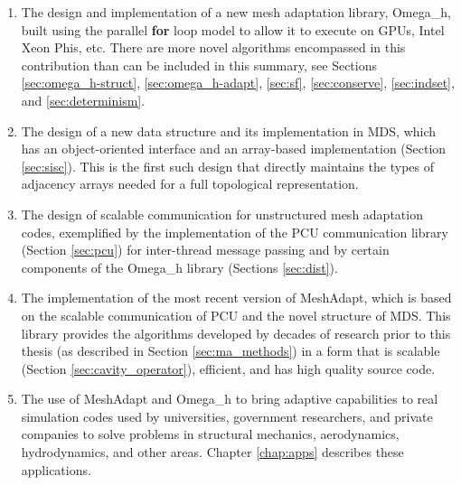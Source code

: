 \begin{enumerate}

\item The design and implementation of a new mesh adaptation library,
Omega\_h, built using the parallel {\bf for} loop model to allow
it to execute on GPUs, Intel Xeon Phis, etc.
There are more novel algorithms encompassed in this contribution
than can be included in this summary, see Sections
\ref{sec:omega_h-struct}, \ref{sec:omega_h-adapt},
\ref{sec:sf}, \ref{sec:conserve}, \ref{sec:indset}, and \ref{sec:determinism}.

\item The design of a new data structure and its implementation
in MDS, which has an object-oriented interface and an array-based
implementation (Section \ref{sec:sisc}).
This is the first such design that directly maintains the types
of adjacency arrays needed for a full topological representation.

\item The design of scalable communication for unstructured mesh
adaptation codes, exemplified by the implementation of the PCU
communication library (Section \ref{sec:pcu}) for inter-thread message passing
and by certain components of the Omega\_h library
(Sections \ref{sec:dist}).

\item The implementation of the most recent version of MeshAdapt,
which is based on the scalable communication of PCU and the
novel structure of MDS.
This library provides the algorithms developed
by decades of research prior to this thesis
(as described in Section \ref{sec:ma_methods}) in a form that is scalable
(Section \ref{sec:cavity_operator}),
efficient, and has high quality source code.

\item The use of MeshAdapt and Omega\_h to bring adaptive capabilities
to real simulation codes used by universities, government
researchers, and private companies to solve problems in structural
mechanics, aerodynamics, hydrodynamics, and other areas.
Chapter \ref{chap:apps} describes these applications.

\end{enumerate}


